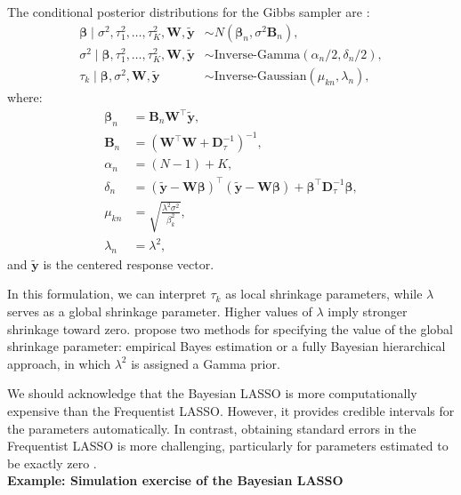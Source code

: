 The conditional posterior distributions for the Gibbs sampler are \cite{Park2008}:
\begin{align*}
	\boldsymbol{\beta} \mid \sigma^2, \tau_1^2, \dots, \tau_K^2, \mathbf{W}, \tilde{\mathbf{y}} &\sim {N}(\boldsymbol{\beta}_n, \sigma^2 \mathbf{B}_n), \\
	\sigma^2 \mid \boldsymbol{\beta}, \tau_1^2, \dots, \tau_K^2, \mathbf{W}, \tilde{\mathbf{y}} &\sim \text{Inverse-Gamma}(\alpha_n/2, \delta_n/2), \\
	\tau_k \mid \boldsymbol{\beta}, \sigma^2, \mathbf{W}, \tilde{\mathbf{y}} &\sim \text{Inverse-Gaussian}(\mu_{kn}, \lambda_n),
\end{align*}
where:
\begin{align*}
	\boldsymbol{\beta}_n &= \mathbf{B}_n \mathbf{W}^{\top} \tilde{\mathbf{y}}, \\
	\mathbf{B}_n &= \left( \mathbf{W}^{\top} \mathbf{W} + \mathbf{D}_{\tau}^{-1} \right)^{-1}, \\
	\alpha_n &= (N - 1) + K, \\
	\delta_n &= (\tilde{\mathbf{y}} - \mathbf{W} \boldsymbol{\beta})^{\top} (\tilde{\mathbf{y}} - \mathbf{W} \boldsymbol{\beta}) + \boldsymbol{\beta}^{\top} \mathbf{D}_{\tau}^{-1} \boldsymbol{\beta}, \\
	\mu_{kn} &= \sqrt{ \frac{ \lambda^2 \sigma^2 }{ \beta_k^2 } }, \\
	\lambda_n &= \lambda^2,
\end{align*}
and $\tilde{\mathbf{y}}$ is the centered response vector.

In this formulation, we can interpret \( \tau_k \) as local shrinkage parameters, while \( \lambda \) serves as a global shrinkage parameter. Higher values of \( \lambda \) imply stronger shrinkage toward zero. \cite{Park2008} propose two methods for specifying the value of the global shrinkage parameter: empirical Bayes estimation or a fully Bayesian hierarchical approach, in which \( \lambda^2 \) is assigned a Gamma prior.

We should acknowledge that the Bayesian LASSO is more computationally expensive than the Frequentist LASSO. However, it provides credible intervals for the parameters automatically. In contrast, obtaining standard errors in the Frequentist LASSO is more challenging, particularly for parameters estimated to be exactly zero \cite{kyung2010penalized}.\\

\textbf{Example: Simulation exercise of the Bayesian LASSO}

